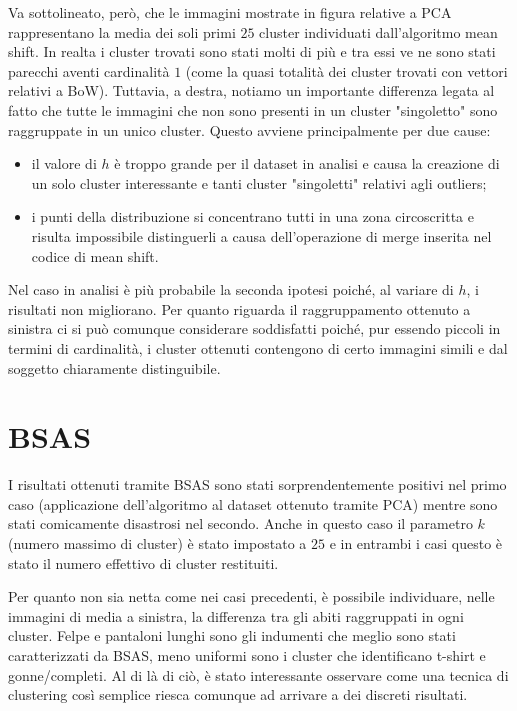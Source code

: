 \documentclass[]{report}
\begin{document}
	Va sottolineato, però, che le immagini mostrate in figura relative a PCA rappresentano la media dei soli primi $25$ cluster individuati dall'algoritmo mean shift. In realta i cluster trovati sono stati molti di più e tra essi ve ne sono stati parecchi aventi cardinalità $1$ (come la quasi totalità dei cluster trovati con vettori relativi a BoW). Tuttavia, a destra, notiamo un importante differenza legata al fatto che tutte le immagini che non sono presenti in un cluster "singoletto" sono raggruppate in un unico cluster. Questo avviene principalmente per due cause:
	\begin{itemize}
		\item il valore di $h$ è troppo grande per il dataset in analisi e causa la creazione di un solo cluster interessante e tanti cluster "singoletti" relativi agli outliers;    
		\item i punti della distribuzione si concentrano tutti in una zona circoscritta e risulta impossibile distinguerli a causa dell'operazione di merge inserita nel codice di mean shift.
	\end{itemize}
	Nel caso in analisi è più probabile la seconda ipotesi poiché, al variare di $h$, i risultati non migliorano.
	Per quanto riguarda il raggruppamento ottenuto a sinistra ci si può comunque considerare soddisfatti poiché, pur essendo piccoli in termini di cardinalità, i cluster ottenuti contengono di certo immagini simili e dal soggetto chiaramente distinguibile.
	
	\section*{BSAS}
	
	I risultati ottenuti tramite BSAS sono stati sorprendentemente positivi nel primo caso  
	(applicazione dell'algoritmo al dataset ottenuto tramite PCA) mentre sono stati comicamente disastrosi nel secondo. 
	Anche in questo caso il parametro $k$ (numero massimo di cluster) è stato impostato a $25$ e in entrambi i casi questo è stato il numero effettivo di cluster restituiti. 
	
	Per quanto non sia netta come nei casi precedenti, è possibile individuare, nelle immagini di media a sinistra, la differenza tra gli abiti raggruppati in ogni cluster. Felpe e pantaloni lunghi sono gli indumenti che meglio sono stati caratterizzati da BSAS, meno uniformi sono i cluster che identificano t-shirt  e gonne/completi. Al di là di ciò, è stato interessante osservare come una tecnica di clustering così semplice riesca comunque ad arrivare a dei discreti risultati. 
	
\end{document}
